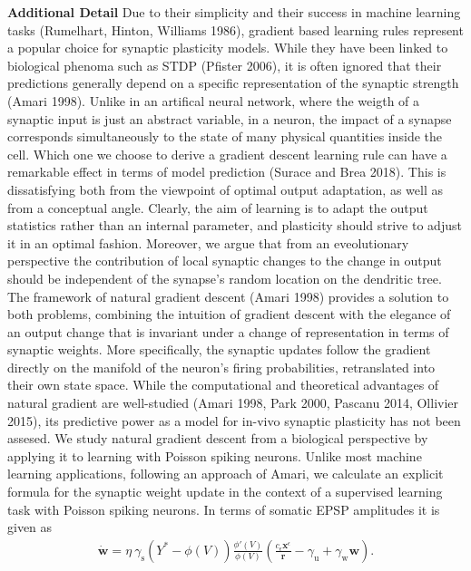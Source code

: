 \documentclass[12pt]{article}
\newcommand{\lb}{\left}
\newcommand{\mb}{\mathbf}
\newcommand{\mrm}{\mathrm}
\newcommand{\rb}{\right}
\newcommand{\xeps}{\mathbf x^{\epsilon}}
\begin{document}
{\bf Additional Detail}
Due to their simplicity and their success in machine learning tasks (Rumelhart, Hinton, Williams 1986), gradient based learning rules represent a popular choice for synaptic plasticity models. While they have been linked to biological phenoma such as STDP (Pfister 2006), it is often ignored that their predictions generally depend on a specific representation of the synaptic strength (Amari 1998). Unlike in an artifical neural network, where the weigth of a synaptic input is just an abstract variable, in a neuron, the impact of a synapse corresponds simultaneously to the state of many physical quantities inside the cell. Which one we choose to derive a gradient descent learning rule can have a remarkable effect in terms of model prediction (Surace and Brea 2018).
This is dissatisfying both from the viewpoint of optimal output adaptation, as well as from a conceptual angle. Clearly, the aim of learning is to adapt the output statistics rather than an internal parameter, and plasticity should strive to adjust it in an optimal fashion. Moreover, we argue that from an eveolutionary perspective the contribution of local synaptic changes to the change in output should be independent of the synapse's random location on the dendritic tree. 
The framework of natural gradient descent (Amari 1998) provides a solution to both problems, combining the intuition of gradient descent with the elegance of an output change that is invariant under a change of representation in terms of synaptic weights. More specifically, the synaptic updates follow the gradient directly on the manifold of the neuron's firing probabilities, retranslated into their own state space. 
While the computational and theoretical advantages of natural gradient are well-studied (Amari 1998, Park 2000, Pascanu 2014, Ollivier 2015), its predictive power as a model for in-vivo synaptic plasticity has not been assesed. We study natural gradient descent from a biological perspective by applying it to learning with Poisson spiking neurons. Unlike most machine learning applications, following an approach of Amari, we calculate an explicit formula for the synaptic weight update in the context of a supervised learning task with Poisson spiking neurons. In terms of somatic EPSP amplitudes it is given as 
\begin{eqnarray}
\label{Results_Natural_Gradient}
\dot{\mb w} =\eta \ \gamma_{\mrm s} \lb(Y^*-\phi(V)\rb) \frac{\phi'(V)}{\phi(V)}\lb(\frac{c_{\epsilon}\xeps}{\mb r}-\gamma_{\mrm u}+\gamma_{\mrm w}{\mb w}\rb).
\end{eqnarray}
\end{document}
